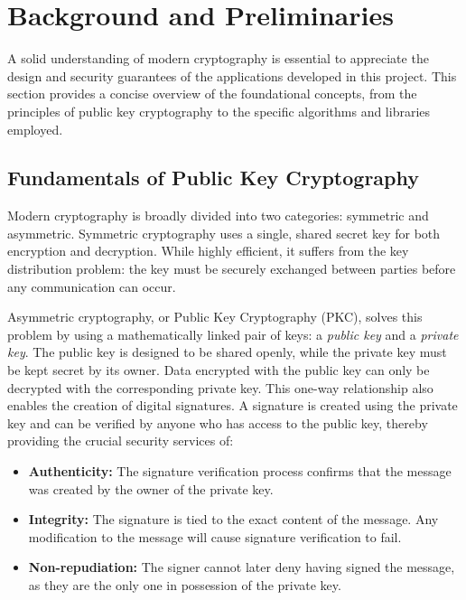 \documentclass[12pt, letterpaper]{article}
\begin{document}
%	
	
	\section{Background and Preliminaries}
	A solid understanding of modern cryptography is essential to appreciate the design and security guarantees of the applications developed in this project. This section provides a concise overview of the foundational concepts, from the principles of public key cryptography to the specific algorithms and libraries employed.
	
	\subsection{Fundamentals of Public Key Cryptography}
	Modern cryptography is broadly divided into two categories: symmetric and asymmetric. Symmetric cryptography uses a single, shared secret key for both encryption and decryption. While highly efficient, it suffers from the key distribution problem: the key must be securely exchanged between parties before any communication can occur.
	
	Asymmetric cryptography, or Public Key Cryptography (PKC), solves this problem by using a mathematically linked pair of keys: a \textit{public key} and a \textit{private key}. The public key is designed to be shared openly, while the private key must be kept secret by its owner. Data encrypted with the public key can only be decrypted with the corresponding private key. This one-way relationship also enables the creation of digital signatures. A signature is created using the private key and can be verified by anyone who has access to the public key, thereby providing the crucial security services of:
	\begin{itemize}
		\item \textbf{Authenticity:} The signature verification process confirms that the message was created by the owner of the private key.
		\item \textbf{Integrity:} The signature is tied to the exact content of the message. Any modification to the message will cause signature verification to fail.
		\item \textbf{Non-repudiation:} The signer cannot later deny having signed the message, as they are the only one in possession of the private key.
	\end{itemize}
	
\end{document}

